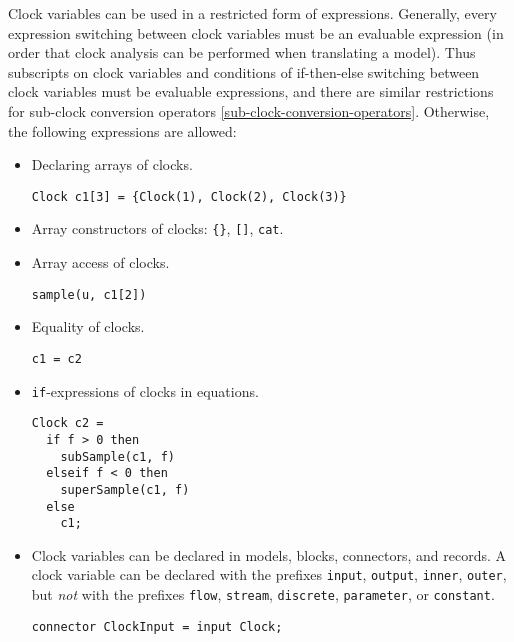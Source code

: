 Clock variables can be used in a restricted form of expressions.
Generally, every expression switching between clock variables must be an evaluable expression (in order that clock analysis can be performed when translating a model).
Thus subscripts on clock variables and conditions of if-then-else switching between clock variables must be evaluable expressions, and there are similar restrictions for sub-clock conversion operators \cref{sub-clock-conversion-operators}.
Otherwise, the following expressions are allowed:
\begin{itemize}
\item
  Declaring arrays of clocks.
  \begin{example}
  \lstinline!Clock c1[3] = {Clock(1), Clock(2), Clock(3)}!
  \end{example}
\item
  Array constructors of clocks: \lstinline!{}!, \lstinline![]!, \lstinline!cat!.
\item
  Array access of clocks.
  \begin{example}
  \lstinline!sample(u, c1[2])!
  \end{example}
\item
  Equality of clocks.
  \begin{example}
  \lstinline!c1 = c2!
  \end{example}
\item
  \lstinline!if!-expressions of clocks in equations.
  \begin{example}
\begin{lstlisting}[language=modelica]
Clock c2 =
  if f > 0 then
    subSample(c1, f)
  elseif f < 0 then
    superSample(c1, f)
  else
    c1;
\end{lstlisting}
  \lstinline!!
  \end{example}
\item
  Clock variables can be declared in models, blocks, connectors, and records.
  A clock variable can be declared with the prefixes \lstinline!input!, \lstinline!output!, \lstinline!inner!, \lstinline!outer!, but \emph{not} with the prefixes \lstinline!flow!, \lstinline!stream!, \lstinline!discrete!, \lstinline!parameter!, or \lstinline!constant!.
  \begin{example}
\begin{lstlisting}[language=modelica]
connector ClockInput = input Clock;
\end{lstlisting}
  \end{example}
\end{itemize}

